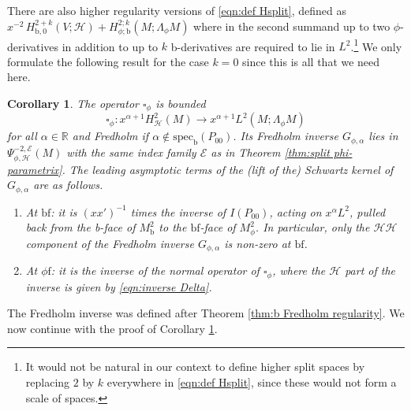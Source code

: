 \documentclass[JEP,XML,SOM,Unicode,NoFloatCountersInSection,published]{cedram}
\theoremstyle{plain}
\newtheorem{Cor}[Th]{Corollary}
\theoremstyle{definition}
\newcommand{\R}{{\mathbb{R}}}
\newcommand\calE{{\mathcal E}}
\newcommand{\phif}{{\phi\mathrm{f}}}
\newcommand{\bb}{{\mathrm{b}}}
\newcommand{\bbf}{{\mathrm{bf}}}
\newcommand{\specb}{\mathrm{spec}_\bb}
\newcommand{\Hsplit}{H_{\mathscr{H}}}
\begin{document}
There are also higher regularity versions of \eqref{eqn:def Hsplit}, defined as $x^{-2}\,H^{2+k}_{\bb,0}(V;\mathscr{H}) + H^{2;k}_{\phi;\bb}(M; \Lambda_\phi M)$ where in the second summand up to two $\phi$-derivatives in addition to up to $k$ b-derivatives are required to lie in $L^2$.\footnote{It would not be natural in our context to define higher split spaces by replacing $2$ by $k$ everywhere in \eqref{eqn:def Hsplit}, since these would not form a scale of spaces.}
We only formulate the following result for the case $k=0$ since this is all that we need here.

\begin{Cor} \label{cor:grihun fredholm inverse}
The operator $\square_\phi$ is bounded\vspace*{-3pt}
\begin{equation}
\label{eqn:box cphi bounded}
\square_{\phi}: x^{\alpha+1} \Hsplit^2(M) \to x^{\alpha+1} L^2 (M; \Lambda_\phi M)
\end{equation}
for all $\alpha\in\R$ and Fredholm if $\alpha\not\in \specb(P_{00})$.
Its Fredholm inverse $G_{\phi,\alpha}$ lies in $\Psi^{-2,\calE}_{\phi, \mathscr{H}}(M)$
with the same index family $\calE$ as in Theorem \ref{thm:split phi-parametrix}.
The leading asymptotic terms of the (lift of the) Schwartz kernel of $G_{\phi,\alpha}$ are as follows.

\begin{enumerate}
\item
At $\bbf$: it is
$(xx')^{-1}$ times the inverse of $I(P_{00})$, acting on $x^\alpha L^2$, pulled back from the
b-face of $M^2_\bb$ to the $\bbf$-face of $M^2_\phi$. In particular, only the
$\mathscr{H}\mathscr{H}$ component of the Fredholm inverse $G_{\phi,\alpha}$ is non-zero at $\bbf$.

\item
At $\phif$: it is the inverse of the normal operator of $\square_{\phi}$, where the $\mathscr{H}$ part of the inverse is given by \eqref{eqn:inverse Delta}.
\end{enumerate}
\end{Cor}

The Fredholm inverse was defined after Theorem \ref{thm:b Fredholm regularity}.
We now continue with the proof of Corollary \ref{cor:grihun fredholm inverse}.
\end{document}

